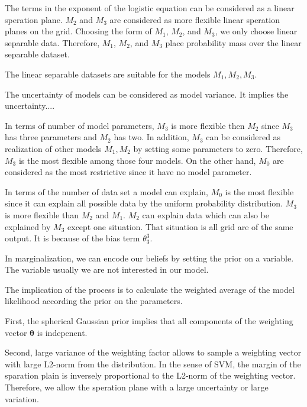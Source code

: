 \documentclass[12pt]{article}
\newenvironment{question}[2][Question]{\begin{trivlist}
\kern10pt
\item[\hskip \labelsep {\bfseries #1}\hskip \labelsep {\bfseries #2.}]}{\end{trivlist}}
\begin{document}
\begin{question}{19}
The terms in the exponent of the logistic equation can be considered as 
a linear speration plane.
$M_2$ and $M_3$ are considered as more flexible linear speration planes on the grid.
Choosing the form of $M_1$, $M_2$, and $M_3$, we only choose linear separable data.
Therefore, $M_1$, $M_2$, and $M_3$ place probability mass over the linear separable
dataset.

The linear separable datasets are suitable for the models $M_1, M_2, M_3$.

The uncertainty of models can be considered as model variance. 
It implies the uncertainty....%

In terms of number of model parameters, $M_3$ is more flexible then $M_2$ since
$M_3$ has three parameters and $M_2$ has two.
In addition, $M_3$ can be considered as realization of other models 
${M_1, M_2}$ by setting some parameters to zero.
Therefore, $M_3$ is the most flexible among those four models.
On the other hand, $M_0$ are considered as the most restrictive since
it have no model parameter.

In terms of the number of data set a model can explain, $M_0$ is the most
flexible since it can explain all possible data by the uniform probability 
distribution.
$M_3$ is more flexible than $M_2$ and $M_1$. $M_2$ can explain data which can 
also be explained by $M_3$ except one situation. That situation is all
grid are of the same output. It is because of the bias term $\theta^3_3$.
\end{question}

\begin{question}{20}
In marginalization, we can encode our beliefs by setting the prior on a variable.
The variable usually we are not interested in our model.

The implication of the process is to calculate the weighted average of the model
likelihood according the prior on the parameters.
\end{question}

\begin{question}{21}
First, the spherical Gaussian prior implies that all components of the weighting
vector $\bm{\theta}$ is indepenent.

Second, large variance of the weighting factor allows to sample a weighting vector
with large L2-norm from the distribution. 
In the sense of SVM, the margin of the sparation plain is 
inversely proportional to the L2-norm of the weighting vector. Therefore, we
allow the speration plane with a large uncertainty or large variation.
\end{question}
\end{document}

